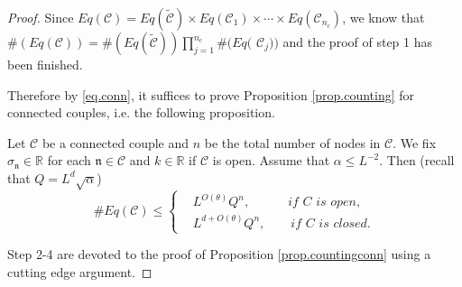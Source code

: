 \begin{proof}
Since $Eq(\mathcal{C})=Eq(\widetilde{\mathcal{C}})\times Eq(\mathcal{C}_{1})\times\cdots\times Eq(\mathcal{C}_{n_c})$, we know that $\#(Eq(\mathcal{C}))= \#(Eq(\widetilde{\mathcal{C}}))\prod_{j=1}^{n_c} \#(Eq($ $\mathcal{C}_{j}))$ and the proof of step 1 has been finished.







Therefore by \eqref{eq.conn}, it suffices to prove Proposition \ref{prop.counting} for connected couples, i.e. the following proposition.

\begin{prop}\label{prop.countingconn} Let $\mathcal{C}$ be a connected couple and $n$ be the total number of nodes in $\mathcal{C}$. We fix $\sigma_{\mathfrak{n}}\in\mathbb{R}$ for each $\mathfrak{n}\in \mathcal{C}$ and $k\in \mathbb{R}$ if $\mathcal{C}$ is open. Assume that $\alpha\le L^{-2}$. Then (recall that $Q=L^{d}\sqrt{\alpha}$)
\begin{equation}\label{eq.countingbd2}\# Eq(\mathcal{C})\leq\left\{\begin{aligned}
&L^{O(\theta)} Q^{n},     \qquad\quad\textit{if $C$ is open},\\
& L^{d+O(\theta) }Q^{n},\qquad\textit{if $C$ is closed}.
\end{aligned}
\right.
\end{equation}
\end{prop}

Step 2-4 are devoted to the proof of Proposition \ref{prop.countingconn} using a cutting edge argument. 



\end{proof}
